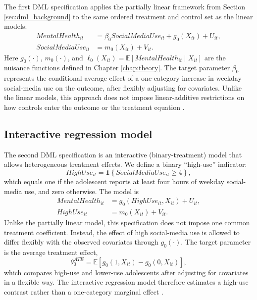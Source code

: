 \documentclass[11pt,oneside,a4paper]{book}
\begin{document}
The first DML specification applies the partially linear framework from Section \ref{sec:dml_background} to the same ordered treatment and control set as the linear models:
\begin{align*}
MentalHealth_{it} &= \beta_0 SocialMediaUse_{it} + g_0(X_{it}) + U_{it}, \\
SocialMediaUse_{it} &= m_0(X_{it}) + V_{it}.
\end{align*}
Here \(g_0(\cdot)\), \(m_0(\cdot)\), and \(\ell_0(X_{it})=\mathbb{E}[MentalHealth_{it}\mid X_{it}]\) are the nuisance functions defined in Chapter \ref{chap:theory}. The target parameter \(\beta_0\) represents the conditional average effect of a one-category increase in weekday social-media use on the outcome, after flexibly adjusting for covariates. Unlike the linear models, this approach does not impose linear-additive restrictions on how controls enter the outcome or the treatment equation \citep{robinson1988rootn,chernozhukov2018dml}. 

\subsection[Interactive Regression Model]{Interactive regression model}

The second DML specification is an interactive (binary-treatment) model that allows heterogeneous treatment effects. We define a binary ``high-use'' indicator: \begin{equation*}
HighUse_{it} = \mathbf{1}\!\left\{SocialMediaUse_{it} \geq 4\right\},
\end{equation*}
which equals one if the adolescent reports at least four hours of weekday social-media use, and zero otherwise. The model is
\begin{align*}
MentalHealth_{it} &= g_0(HighUse_{it}, X_{it}) + U_{it}, \\
HighUse_{it} &= m_0(X_{it}) + V_{it}.
\end{align*} Unlike the partially linear model, this specification does not impose one common treatment coefficient. Instead, the effect of high social-media use is allowed to differ flexibly with the observed covariates through \(g_0(\cdot)\). The target parameter is the average treatment effect,
\begin{equation*}
\theta_0^{ATE} = \mathbb{E}\!\left[g_0(1, X_{it}) - g_0(0, X_{it})\right],
\end{equation*}
which compares high-use and lower-use adolescents after adjusting for covariates in a flexible way. The interactive regression model therefore estimates a high-use contrast rather than a one-category marginal effect \citep{chernozhukov2018dml}.
\end{document}
